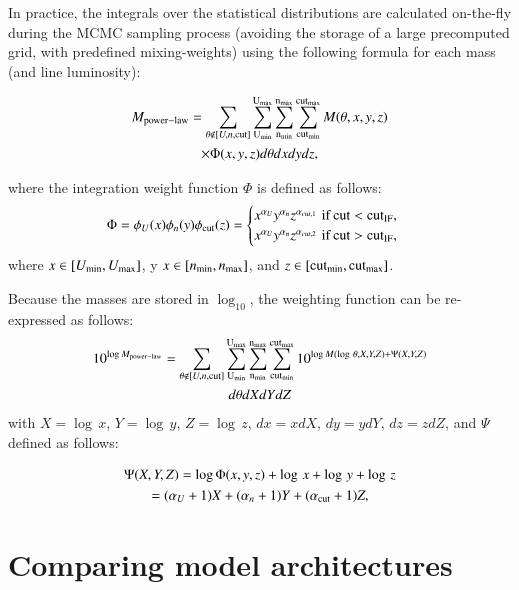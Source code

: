 \documentclass{aa}
\begin{document}
In practice, the integrals over the statistical distributions are calculated on-the-fly during the MCMC sampling process (avoiding the storage of a large precomputed grid, with predefined mixing-weights) using the following formula for each mass (and line luminosity):

\begin{multline}
\label{e1}
    M_{\rm power-law} = \sum_{\theta \notin [U,n,\rm cut]} \sum_{\rm U_{min}}^{\rm U_{max}} \sum_{\rm n_{min}}^{\rm n_{max}} \sum_{\rm cut_{min}}^{\rm cut_{max}}  M(\theta, x,y,z)\\ \times \Phi(x,y,z) d\theta dx dy dz,
\end{multline}

where the integration weight function $\Phi$ is defined as follows:
\begin{equation}
        \Phi = \phi_{U}(x)\phi_{n}(y)\phi_{\rm cut}(z)=
    \begin{cases}
        x^{\alpha_U} y^{\alpha_n}z^{\alpha_{cut,1}}\, \rm \,if\, cut < cut_{\rm IF},\\
        x^{\alpha_U} y^{\alpha_n} z^{\alpha_{cut,2}}\, \rm \,if\, cut > cut_{\rm IF},    
    \end{cases}
\end{equation}
where $x \in [U_{\rm min}, U_{\rm max}]$, y $x \in [n_{\rm min}, n_{\rm max}]$, and $z \in [{\rm cut_{min}}, {\rm cut_{max}}]$. 

Because the masses are stored in $\log_{10}$, the weighting function can be re-expressed as follows:
\begin{multline}
\label{e2}
    10^{\log M_{\rm power-law}} = \sum_{\theta \notin [U,n,\rm cut]} \sum_{\rm U_{min}}^{\rm U_{max}} \sum_{\rm n_{min}}^{\rm n_{max}} \sum_{\rm cut_{min}}^{\rm cut_{max}}  10^{\log M(\log\, \theta, X,Y,Z)+\Psi(X,Y,Z)}\\ d\theta dX dY dZ
\end{multline}
with $X=\log\, x$, $Y=\log\, y$, $Z=\log\, z$, $dx = xdX$, $dy=ydY$, $dz=zdZ$, and $\Psi$ defined as follows:

\begin{multline}
        \Psi(X,Y,Z) = \log \Phi(x,y,z)+\log\, x+\log\, y+\log\, z\\
        = (\alpha_U + 1)X + (\alpha_n + 1)Y + (\alpha_{\rm cut} + 1)Z,
\end{multline}
 
\section{Comparing model architectures}
\label{section_results}
\end{document}
